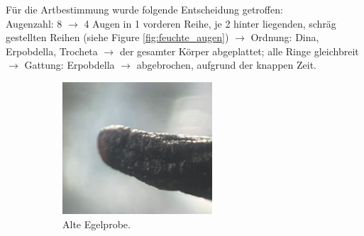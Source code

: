 \documentclass[oneside,10pt,a4paper]{report}
\begin{document}
				Für die Artbestimmung wurde folgende Entscheidung getroffen:\\
				Augenzahl: 8 $\rightarrow$ 4 Augen in 1 vorderen Reihe, je 2 hinter liegenden, schräg gestellten Reihen (siehe Figure \ref{fig:feuchte_augen}) $\rightarrow$  Ordnung: Dina, Erpobdella, Trocheta $\rightarrow$ der gesamter Körper abgeplattet; alle Ringe gleichbreit $\rightarrow$  Gattung: Erpobdella $\rightarrow$  abgebrochen, aufgrund der knappen Zeit.\\
				\begin{figure}[H]
					\centering
					\begin{subfigure}[b]{0.55\textwidth}
						\includegraphics[width=\textwidth]{trockene_dichotom.jpg}
						\caption{Alte Egelprobe.}
						\label{fig: trockene_augen}
					\end{subfigure}
					\hfill
					\begin{subfigure}[b]{0.37\textwidth}

\end{subfigure}
\end{figure}
\end{document}
